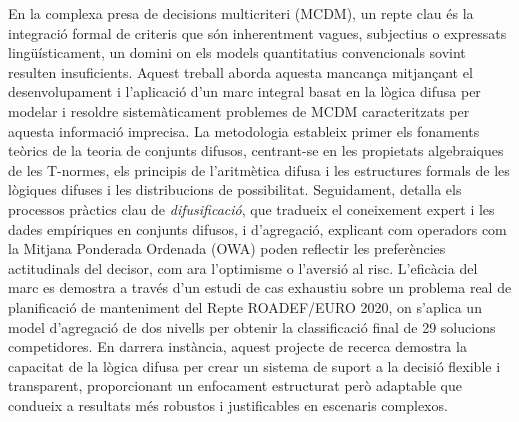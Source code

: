 \newpage
\begin{poliabstract}[Resum]
    En la complexa presa de decisions multicriteri (MCDM), un repte clau és la integració formal de criteris que són inherentment vagues, subjectius o expressats lingüísticament, un domini on els models quantitatius convencionals sovint resulten insuficients. Aquest treball aborda aquesta mancança mitjançant el desenvolupament i l'aplicació d'un marc integral basat en la lògica difusa per modelar i resoldre sistemàticament problemes de MCDM caracteritzats per aquesta informació imprecisa. La metodologia estableix primer els fonaments teòrics de la teoria de conjunts difusos, centrant-se en les propietats algebraiques de les T-normes, els principis de l'aritmètica difusa i les estructures formals de les lògiques difuses i les distribucions de possibilitat. Seguidament, detalla els processos pràctics clau de \textit{difusificació}, que tradueix el coneixement expert i les dades empíriques en conjunts difusos, i d'agregació, explicant com operadors com la Mitjana Ponderada Ordenada (OWA) poden reflectir les preferències actitudinals del decisor, com ara l'optimisme o l'aversió al risc. L'eficàcia del marc es demostra a través d'un estudi de cas exhaustiu sobre un problema real de planificació de manteniment del Repte ROADEF/EURO 2020, on s'aplica un model d'agregació de dos nivells per obtenir la classificació final de 29 solucions competidores. En darrera instància, aquest projecte de recerca demostra la capacitat de la lògica difusa per crear un sistema de suport a la decisió flexible i transparent, proporcionant un enfocament estructurat però adaptable que condueix a resultats més robustos i justificables en escenaris complexos.
\end{poliabstract}
